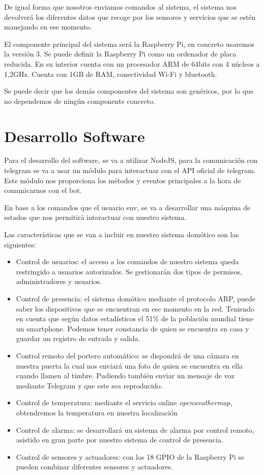 \documentclass[10pt,journal,compsoc]{IEEEtran}
\begin{document}
De igual forma que nosotros enviamos comandos al sistema, el sistema nos devolverá los diferentes 
datos que recoge por los sensores y servicios que se estén manejando en ese momento.

El componente principal del sistema será la Raspberry Pi, en concreto usaremos 
la versión 3. Se puede definir la Raspberry Pi como un ordenador de placa 
reducida. En su interior cuenta con un procesador ARM de 64bits con 4 núcleos a 
1,2GHz. Cuenta con 1GB de RAM, conectividad Wi-Fi y bluetooth.

Se puede decir que los demás componentes del sistema son genéricos, por lo que 
no dependemos de ningún componente concreto.

\section{Desarrollo Software}
Para el desarrollo del software, se va a utilizar NodeJS, para la comunicación con telegram se va a 
usar un módulo para interactuar con el API oficial de telegram. Este módulo nos proporciona los 
métodos y eventos principales a la hora de comunicarnos con el bot.

En base a los comandos que el usuario env, se va a desarrollar una máquina de estados que nos 
permitirá interactuar con nuestro sistema.

Las características que se van a incluir en nuestro sistema domótico son las siguientes:
\begin{itemize}
\item Control de usuarios: el acceso a los comandos de nuestro sistema queda restringido a 
usuarios autorizados. Se gestionarán dos tipos de permisos, administradores y usuarios.
\item Control de presencia: el sistema domótico mediante el protocolo ARP, puede saber los 
dispositivos que se encuentran en ese momento en la red. Teniendo en cuenta que según datos 
estadísticos el 51\% de la población mundial tiene un smartphone. Podemos tener constancia de 
quien se encuentra en casa y guardar un registro de entrada y salida.
\item Control remoto del portero automático: se dispondrá de una cámara en nuestra puerta la cual 
nos enviará una foto de quien se encuentra en ella cuando llamen al timbre. Pudiendo también enviar 
un mensaje de voz mediante Telegram y que este sea reproducido.
\item Control de temperatura: mediante el servicio online \textit{openweathermap}, obtendremos la 
temperatura en nuestra localización
\item Control de alarma: se desarrollará un sistema de alarma por control remoto, asistido en 
gran parte por nuestro sistema de control de presencia.
\item Control de sensores y actuadores: con los 18 GPIO de la Raspberry Pi se pueden combinar 
diferentes sensores y actuadores.
\end{itemize}
\end{document}
